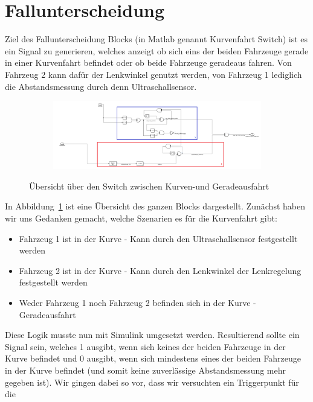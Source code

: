 \section{Fallunterscheidung}\label{sec:fallunterscheidung}
Ziel des Fallunterscheidung Blocks (in Matlab genannt Kurvenfahrt Switch) ist es
ein Signal zu generieren, welches anzeigt ob sich eins der beiden Fahrzeuge
gerade in einer Kurvenfahrt befindet oder ob beide Fahrzeuge geradeaus fahren.
Von Fahrzeug 2 kann dafür der Lenkwinkel genutzt werden, von Fahrzeug 1
lediglich die Abstandsmessung durch denn Ultraschallsensor.
\begin{figure}[hbt]
\centering
\begin{subfigure}{1.0\textwidth}
    \centering
    \includegraphics*[width=\textwidth]{figures/abstand_switch_fulll.png}
\end{subfigure}
    \caption{Übersicht über den Switch zwischen Kurven-und Geradeausfahrt
    \label{fig:switch-full}}
\end{figure}
In Abbildung~\ref{fig:switch-full} ist eine Übersicht des ganzen Blocks
dargestellt. Zunächst haben wir uns Gedanken gemacht, welche Szenarien es für
die Kurvenfahrt gibt:
\begin{itemize}
    \item Fahrzeug 1 ist in der Kurve - Kann durch den Ultraschallsensor
        festgestellt werden
    \item Fahrzeug 2 ist in der Kurve - Kann durch den Lenkwinkel der
        Lenkregelung festgestellt werden
    \item Weder Fahrzeug 1 noch Fahrzeug 2 befinden sich in der Kurve -
        Geradeausfahrt
\end{itemize}
Diese Logik musste nun mit Simulink umgesetzt werden. Resultierend sollte ein
Signal sein, welches 1 ausgibt, wenn sich keines der beiden Fahrzeuge in der
Kurve befindet und 0 ausgibt, wenn sich mindestens eines der beiden Fahrzeuge in
der Kurve befindet (und somit keine zuverlässige Abstandsmessung mehr gegeben
ist). Wir gingen dabei so vor, dass wir versuchten ein Triggerpunkt für die
